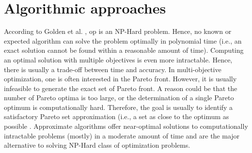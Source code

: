 \section{Algorithmic approaches}\label{sec:alg_approaches}
According to Golden et al. \parencite{Golden1987TheProblem}, \gls{op} is an NP-Hard problem. Hence, no known or expected algorithm can solve the problem optimally in polynomial time (i.e., an exact solution cannot be found within a reasonable amount of time). Computing an optimal solution with multiple objectives is even more intractable. Hence, there is usually a trade-off between time and accuracy. In multi-objective optimization, one is often interested in the Pareto front. However, it is usually infeasible to generate the exact set of Pareto front. A reason could be that the number of Pareto optima is too large, or the determination of a single Pareto optimum is computationally hard. Therefore, the goal is usually to identify a satisfactory Pareto set approximation (i.e., a set as close to the optimum as possible \parencite{Fonseca2005AOptimizers}. Approximate algorithms offer near-optimal solutions to computationally intractable problems (mostly) in a moderate amount of time and are the major alternative to solving NP-Hard class of optimization problems.

